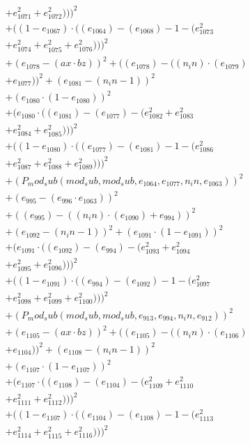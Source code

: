 \documentclass[10pt, a4paper]{article}
\begin{document}
\begin{align*}
& + e_{1071}^{2} + e_{1072}^{2})))^{2} \\
& + ((1 - e_{1067})  \cdot  ((e_{1064}) - (e_{1068}) - 1 - (e_{1073}^{2} \\
& + e_{1074}^{2} + e_{1075}^{2} + e_{1076}^{2})))^{2} \\
& + (e_{1078} - (ax  \cdot  bz))^{2} + ((e_{1078}) - ((n_in)  \cdot  (e_{1079}) \\
& + e_{1077}))^{2} + (e_{1081} - (n_in - 1))^{2} \\
& + (e_{1080}  \cdot  (1 - e_{1080}))^{2} \\
& + (e_{1080}  \cdot  ((e_{1081}) - (e_{1077}) - (e_{1082}^{2} + e_{1083}^{2} \\
& + e_{1084}^{2} + e_{1085}^{2})))^{2} \\
& + ((1 - e_{1080})  \cdot  ((e_{1077}) - (e_{1081}) - 1 - (e_{1086}^{2} \\
& + e_{1087}^{2} + e_{1088}^{2} + e_{1089}^{2})))^{2} \\
& + (P_mod_sub(mod_sub, mod_sub, e_{1064}, e_{1077}, n_in, e_{1063}))^{2} \\
& + (e_{995} - (e_{996}  \cdot  e_{1063}))^{2} \\
& + ((e_{995}) - ((n_in)  \cdot  (e_{1090}) + e_{994}))^{2} \\
& + (e_{1092} - (n_in - 1))^{2} + (e_{1091}  \cdot  (1 - e_{1091}))^{2} \\
& + (e_{1091}  \cdot  ((e_{1092}) - (e_{994}) - (e_{1093}^{2} + e_{1094}^{2} \\
& + e_{1095}^{2} + e_{1096}^{2})))^{2} \\
& + ((1 - e_{1091})  \cdot  ((e_{994}) - (e_{1092}) - 1 - (e_{1097}^{2} \\
& + e_{1098}^{2} + e_{1099}^{2} + e_{1100}^{2})))^{2} \\
& + (P_mod_sub(mod_sub, mod_sub, e_{913}, e_{994}, n_in, e_{912}))^{2} \\
& + (e_{1105} - (ax  \cdot  bz))^{2} + ((e_{1105}) - ((n_in)  \cdot  (e_{1106}) \\
& + e_{1104}))^{2} + (e_{1108} - (n_in - 1))^{2} \\
& + (e_{1107}  \cdot  (1 - e_{1107}))^{2} \\
& + (e_{1107}  \cdot  ((e_{1108}) - (e_{1104}) - (e_{1109}^{2} + e_{1110}^{2} \\
& + e_{1111}^{2} + e_{1112}^{2})))^{2} \\
& + ((1 - e_{1107})  \cdot  ((e_{1104}) - (e_{1108}) - 1 - (e_{1113}^{2} \\
& + e_{1114}^{2} + e_{1115}^{2} + e_{1116}^{2})))^{2} \\

\end{align*}
\end{document}
